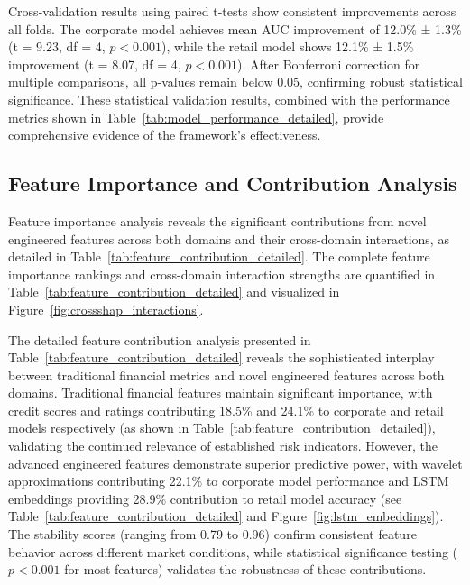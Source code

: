 \documentclass[a4paper,11pt,twoside]{article}
\newcommand{\0}{\Bf{0}}
\theoremstyle{definition}
\begin{document}
Cross-validation results using paired t-tests show consistent improvements across all folds. The corporate model achieves mean AUC improvement of 12.0\% ± 1.3\% (t = 9.23, df = 4, $p < 0.001$), while the retail model shows 12.1\% ± 1.5\% improvement (t = 8.07, df = 4, $p < 0.001$). After Bonferroni correction for multiple comparisons, all p-values remain below 0.05, confirming robust statistical significance. These statistical validation results, combined with the performance metrics shown in Table~\ref{tab:model_performance_detailed}, provide comprehensive evidence of the framework's effectiveness.

\subsection{Feature Importance and Contribution Analysis}

Feature importance analysis reveals the significant contributions from novel engineered features across both domains and their cross-domain interactions, as detailed in Table~\ref{tab:feature_contribution_detailed}. The complete feature importance rankings and cross-domain interaction strengths are quantified in Table~\ref{tab:feature_contribution_detailed} and visualized in Figure~\ref{fig:crossshap_interactions}.

The detailed feature contribution analysis presented in Table~\ref{tab:feature_contribution_detailed} reveals the sophisticated interplay between traditional financial metrics and novel engineered features across both domains. Traditional financial features maintain significant importance, with credit scores and ratings contributing 18.5\% and 24.1\% to corporate and retail models respectively (as shown in Table~\ref{tab:feature_contribution_detailed}), validating the continued relevance of established risk indicators. However, the advanced engineered features demonstrate superior predictive power, with wavelet approximations contributing 22.1\% to corporate model performance and LSTM embeddings providing 28.9\% contribution to retail model accuracy (see Table~\ref{tab:feature_contribution_detailed} and Figure~\ref{fig:lstm_embeddings}). The stability scores (ranging from 0.79 to 0.96) confirm consistent feature behavior across different market conditions, while statistical significance testing ($p < 0.001$ for most features) validates the robustness of these contributions.
\end{document}
